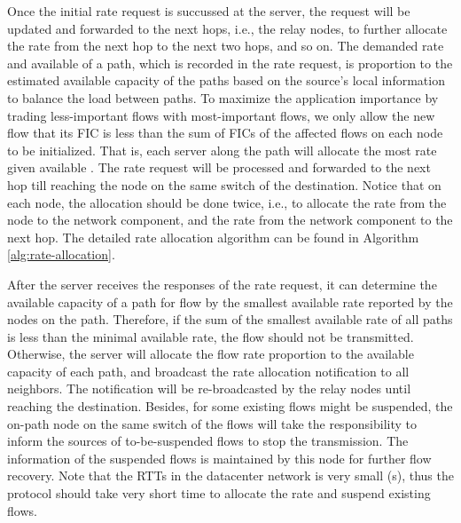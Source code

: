 \documentclass[conference]{IEEEtran}
\begin{document}
Once the initial rate request is succussed at the server, the request will be updated and forwarded to the next hops, i.e., the relay nodes, to further allocate the rate from the next hop to the next two hops, and so on. The demanded rate and available  of a path, which is recorded in the rate request, is proportion to the estimated available capacity of the paths based on the source's local information to balance the load between paths. To maximize the application importance by trading less-important flows with most-important flows, we only allow the new flow that its FIC is less than the sum of FICs of the affected flows on each node to be initialized. That is, each server along the path will allocate the most rate given available . The rate request will be processed and forwarded to the next hop till reaching the node on the same switch of the destination. Notice that on each node, the allocation should be done twice, i.e., to allocate the rate from the node to the network component, and the rate from the network component to the next hop. The detailed rate allocation algorithm can be found in Algorithm \ref{alg:rate-allocation}.

After the server receives the responses of the rate request, it can determine the available capacity of a path for flow  by the smallest available rate reported by the nodes on the path. Therefore, if the sum of the smallest available rate of all paths is less than the minimal available rate, the flow should not be transmitted. Otherwise, the server will allocate the flow rate proportion to the available capacity of each path, and broadcast the rate allocation notification to all neighbors. The notification will be re-broadcasted by the relay nodes until reaching the destination. Besides, for some existing flows might be suspended, the on-path node on the same switch of the flows will take the responsibility to inform the sources of to-be-suspended flows to stop the transmission. The information of the suspended flows is maintained by this node for further flow recovery. Note that the RTTs in the datacenter network is very small (s), thus the protocol should take very short time to allocate the rate and suspend existing flows.
\end{document}
